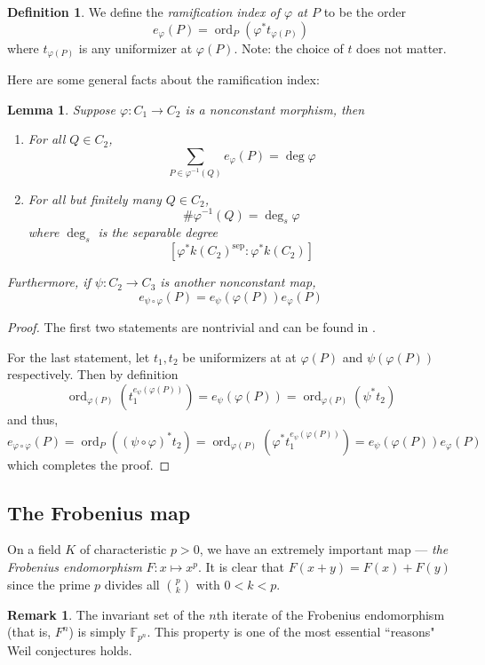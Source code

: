 \documentclass[12pt]{article}
\newtheorem{lemma}{Lemma}[subsection]
\theoremstyle{remark}
\theoremstyle{definition}
\newtheorem{remark}{Remark}[subsection]
\newtheorem{definition}{Definition}[subsection]
\newcommand{\ord}[0]{\operatorname{ord}}
\newcommand{\F}[0]{\mathbb{F}}
\begin{document}
            \begin{definition}
                We define the \textit{ramification index of $\varphi$ at $P$} to be the order
                \[e_\varphi(P)=\ord_P\left(\varphi^*t_{\varphi(P)}\right)\]
                where $t_{\varphi(P)}$ is any uniformizer at $\varphi(P)$. Note: the choice of $t$ does not matter.
            \end{definition}
            Here are some general facts about the ramification index:
            \begin{lemma}\label{lemma-rami}
                Suppose $\varphi:C_1\to C_2$ is a nonconstant morphism, then
                \begin{enumerate}[\normalfont(i)]
                    \item For all $Q\in C_2$,
                    \[\sum_{P\in\varphi^{-1}(Q)}e_{\varphi}(P)=\deg \varphi\]
                    \item For all but finitely many $Q\in C_2$,
                    \[\#\varphi^{-1}(Q)=\deg_s \varphi\]
                    where $\deg_s$ is the separable degree
                    \[[\varphi^*k(C_2)^{\mathrm{sep}}:\varphi^*k(C_2)]\]
                \end{enumerate}
                Furthermore, if $\psi:C_2\to C_3$ is another nonconstant map,
                \[e_{\psi\circ\varphi}(P)=e_{\psi}(\varphi(P))e_{\varphi}(P)\]
            \end{lemma}
            \begin{proof}
                The first two statements are nontrivial and can be found in \cite{hartshorne_2010_algebraic}.
                
                For the last statement, let $t_1,t_2$ be uniformizers at at $\varphi(P)$ and $\psi(\varphi(P))$ respectively. Then by definition
                \[\ord_{\varphi(P)}\left(t_1^{e_{\psi}(\varphi(P))}\right)=e_{\psi}(\varphi(P))=\ord_{\varphi(P)}(\psi^*t_2)\]
                and thus,
                \[e_{\varphi\circ\varphi}(P)=\ord_{P}((\psi\circ\varphi)^*t_2)=\ord_{\varphi(P)}(\varphi^*t_1^{e_{\psi}(\varphi(P))})=e_{\psi}(\varphi(P))e_{\varphi}(P)\]
                which completes the proof.
            \end{proof}
        \subsection{The Frobenius map}
            On a field $K$ of characteristic $p>0$, we have an extremely important map --- \textit{the Frobenius endomorphism} $F:x\mapsto x^p$. It is clear that $F(x+y)=F(x)+F(y)$ since the prime $p$ divides all $\binom{p}{k}$ with $0<k<p$.
            \begin{remark}
                The invariant set of the $n$th iterate of the Frobenius endomorphism (that is, $F^n$) is simply $\F_{p^n}$. This property is one of the most essential ``reasons" Weil conjectures holds. 
            \end{remark}
            
\end{document}
